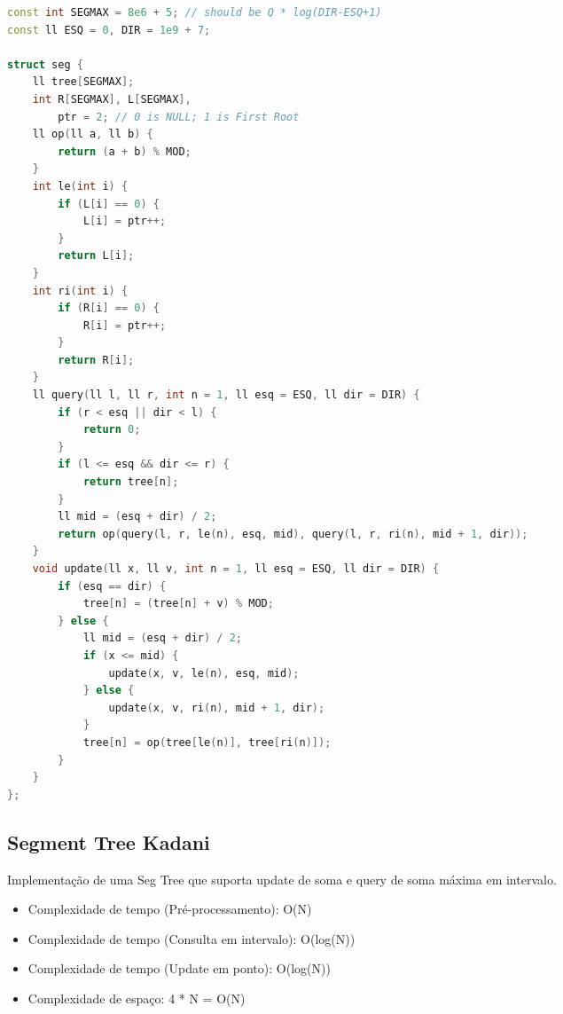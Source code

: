 \documentclass[11pt, a4paper, oneside]{book}
\begin{document}
\begin{multicols}{2}
\begin{lstlisting}[language=C++]
const int SEGMAX = 8e6 + 5; // should be Q * log(DIR-ESQ+1)
const ll ESQ = 0, DIR = 1e9 + 7;

struct seg {
    ll tree[SEGMAX];
    int R[SEGMAX], L[SEGMAX],
        ptr = 2; // 0 is NULL; 1 is First Root
    ll op(ll a, ll b) {
        return (a + b) % MOD;
    }
    int le(int i) {
        if (L[i] == 0) {
            L[i] = ptr++;
        }
        return L[i];
    }
    int ri(int i) {
        if (R[i] == 0) {
            R[i] = ptr++;
        }
        return R[i];
    }
    ll query(ll l, ll r, int n = 1, ll esq = ESQ, ll dir = DIR) {
        if (r < esq || dir < l) {
            return 0;
        }
        if (l <= esq && dir <= r) {
            return tree[n];
        }
        ll mid = (esq + dir) / 2;
        return op(query(l, r, le(n), esq, mid), query(l, r, ri(n), mid + 1, dir));
    }
    void update(ll x, ll v, int n = 1, ll esq = ESQ, ll dir = DIR) {
        if (esq == dir) {
            tree[n] = (tree[n] + v) % MOD;
        } else {
            ll mid = (esq + dir) / 2;
            if (x <= mid) {
                update(x, v, le(n), esq, mid);
            } else {
                update(x, v, ri(n), mid + 1, dir);
            }
            tree[n] = op(tree[le(n)], tree[ri(n)]);
        }
    }
};
\end{lstlisting}
\end{multicols}

\hfill

\subsection{Segment Tree Kadani}


Implementação de uma Seg Tree que suporta update de soma e query de soma máxima em intervalo.



\begin{itemize}
\item Complexidade de tempo (Pré-processamento): O(N)
\item Complexidade de tempo (Consulta em intervalo): O(log(N))
\item Complexidade de tempo (Update em ponto): O(log(N))
\item Complexidade de espaço: 4 * N = O(N)
\end{itemize}

\hfill
\end{document}
